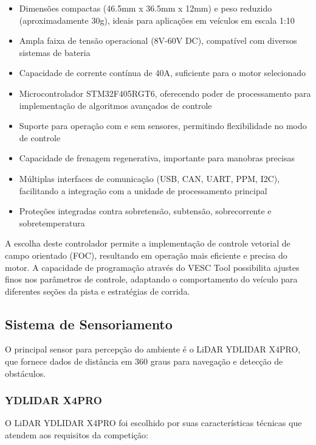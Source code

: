 \begin{itemize}
      \item Dimensões compactas (46.5mm x 36.5mm x 12mm) e peso reduzido (aproximadamente
            30g), ideais para aplicações em veículos em escala 1:10
      \item Ampla faixa de tensão operacional (8V-60V DC), compatível com diversos sistemas
            de bateria
      \item Capacidade de corrente contínua de 40A, suficiente para o motor selecionado
      \item Microcontrolador STM32F405RGT6, oferecendo poder de processamento para
            implementação de algoritmos avançados de controle
      \item Suporte para operação com e sem sensores, permitindo flexibilidade no modo de
            controle
      \item Capacidade de frenagem regenerativa, importante para manobras precisas
      \item Múltiplas interfaces de comunicação (USB, CAN, UART, PPM, I2C), facilitando a
            integração com a unidade de processamento principal
      \item Proteções integradas contra sobretensão, subtensão, sobrecorrente e
            sobretemperatura
\end{itemize}

A escolha deste controlador permite a implementação de controle vetorial de
campo orientado (FOC), resultando em operação mais eficiente e precisa do
motor. A capacidade de programação através do VESC Tool possibilita ajustes
finos nos parâmetros de controle, adaptando o comportamento do veículo para
diferentes seções da pista e estratégias de corrida.

\subsection{Sistema de Sensoriamento}

O principal sensor para percepção do ambiente é o LiDAR YDLIDAR X4PRO, que
fornece dados de distância em 360 graus para navegação e detecção de
obstáculos.

\subsubsection{YDLIDAR X4PRO}

O LiDAR YDLIDAR X4PRO foi escolhido por suas características técnicas que
atendem aos requisitos da competição:

